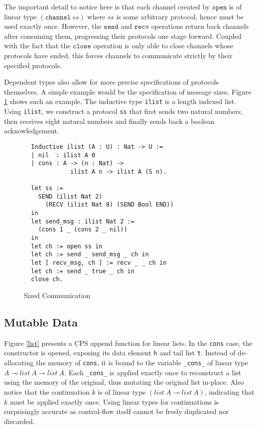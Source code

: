 \documentclass[sigplan,screen,review,anonymous]{acmart}
\newcommand{\channel}{\texttt{channel}}
\newcommand{\open}{\texttt{open}}
\newcommand{\close}{\texttt{close}}
\newcommand{\send}{\texttt{send}}
\newcommand{\recv}{\texttt{recv}}
\begin{document}
The important detail to notice here is that each channel created by $\open$ is of linear type $(\channel\ ss)$ where $ss$ is some arbitrary protocol, hence must be used exactly once. However, the $\send$ and $\recv$ operations return back channels after consuming them, progressing their protocols one stage forward. Coupled with the fact that the $\close$ operation is only able to close channels whose protocols have ended, this forces channels to communicate strictly by their specified protocols.

Dependent types also allow for more precise specifications of protocols themselves. A simple example would be the specification of message sizes. Figure \ref{communication} shows such an example. The inductive type \texttt{ilist} is a length indexed list. Using \texttt{ilist}, we construct a protocol \texttt{ss} that first sends two natural numbers, then receives eight natural numbers and finally sends back a boolean acknowledgement.

\begin{figure}[h]
  \caption{Sized Communication}
  \begin{verbatim}
  Inductive ilist (A : U) : Nat -> U :=
  | nil  : ilist A 0
  | cons : A -> (n : Nat) -> 
             ilist A n -> ilist A (S n).

  let ss := 
    SEND (ilist Nat 2) 
      (RECV (ilist Nat 8) (SEND Bool END)) 
  in
  let send_msg : ilist Nat 2 := 
    (cons 1 _ (cons 2 _ nil)) 
  in
  let ch := open ss in
  let ch := send _ send_msg _ ch in
  let [ recv_msg, ch ] := recv _ _ ch in
  let ch := send _ true _ ch in
  close ch.            
  \end{verbatim}
  \label{communication}
  \Description{}
\end{figure}

\subsection{Mutable Data}
Figure \ref{list} presents a CPS append function for linear lists. In the \texttt{cons} case, the constructor is opened, exposing its data element \texttt{h} and tail list \texttt{t}. Instead of de-allocating the memory of \texttt{cons}, it is bound to the variable \texttt{_cons_} of linear type $A \multimap list\ A \multimap list\ A$. Each \texttt{_cons_} is applied exactly once to reconstruct a list using the memory of the original, thus mutating the original list in-place. Also notice that the continuation $k$ is of linear type $(list\ A \multimap list\ A)$, indicating that $k$ must be applied exactly once. Using linear types for continuations is surprisingly accurate as control-flow itself cannot be freely duplicated nor discarded.
\end{document}

